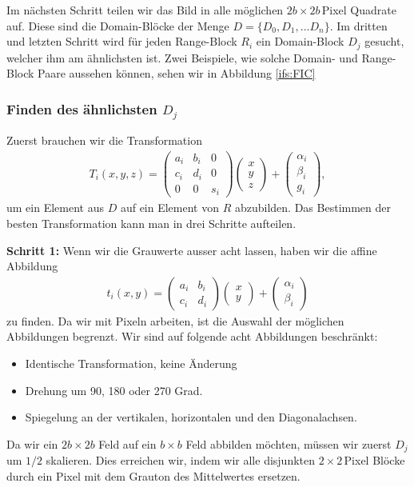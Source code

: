 Im nächsten Schritt teilen wir das Bild in alle möglichen $2b \times 2b$\,Pixel Quadrate auf. Diese sind die Domain-Blöcke der Menge $D = \{D_0,D_1,...D_n\}$. 
Im dritten und letzten Schritt wird für jeden Range-Block $R_i$ ein Domain-Block $D_j$ gesucht, welcher ihm am ähnlichsten ist.
Zwei Beispiele, wie solche Domain- und Range-Block Paare aussehen können, sehen wir in Abbildung \ref{ifs:FIC}

\subsubsection{Finden des ähnlichsten $D_j$}
Zuerst brauchen wir die Transformation 
\begin{align*}
	T_i(x,y,z) = 
	\begin{pmatrix}
		a_i & b_i & 0 \\
		c_i & d_i & 0 \\
		0 & 0 & s_i
	\end{pmatrix}
	\begin{pmatrix}
		x \\
		y \\
		z
	\end{pmatrix}
	+
	\begin{pmatrix}
		\alpha_i \\
		\beta_i \\
		g_i
	\end{pmatrix},
\end{align*}
um ein Element aus $D$ auf ein Element von $R$ abzubilden. 
Das Bestimmen der besten Transformation kann man in drei Schritte aufteilen.

\textbf{Schritt 1: }Wenn wir die Grauwerte ausser acht lassen, haben wir die affine Abbildung
\begin{align}
	t_i(x,y) = 	
	\begin{pmatrix}
		a_i & b_i \\
		c_i & d_i
	\end{pmatrix}
	\begin{pmatrix}
		x \\
		y
	\end{pmatrix}
	+
	\begin{pmatrix}
		\alpha_i \\
		\beta_i
	\end{pmatrix}
\label{ifs:affTrans}
\end{align}
zu finden.
Da wir mit Pixeln arbeiten, ist die Auswahl der möglichen Abbildungen begrenzt.
Wir sind auf folgende acht Abbildungen beschränkt:
\begin{itemize}
	\item Identische Transformation, keine Änderung
	\item Drehung um 90, 180 oder 270 Grad.
	\item Spiegelung an der vertikalen, horizontalen und den Diagonalachsen.
\end{itemize}
Da wir ein $2b \times 2b$ Feld auf ein $b \times b$ Feld abbilden möchten, müssen wir zuerst $D_j$ um $1/2$ skalieren.
Dies erreichen wir, indem wir alle disjunkten $2 \times 2$\,Pixel Blöcke durch ein Pixel mit dem Grauton des Mittelwertes ersetzen.
%

